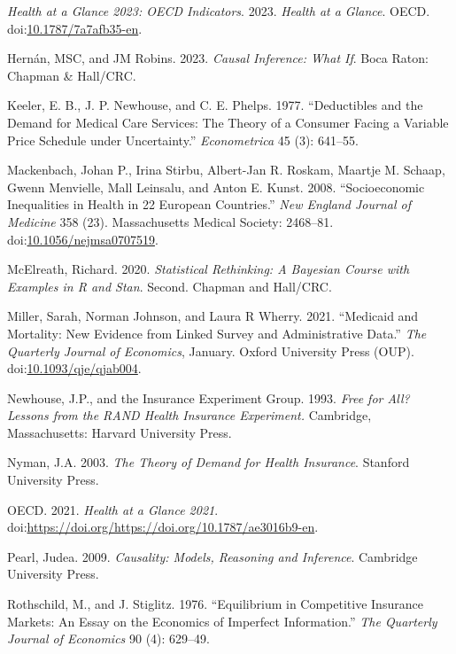 \documentclass[a4paper,12pt]{article}
\begin{document}
\hypertarget{citeproc_bib_item_13}{\textit{Health at a Glance 2023: OECD Indicators}. 2023. \textit{Health at a Glance}. OECD. doi:\href{https://doi.org/10.1787/7a7afb35-en}{10.1787/7a7afb35-en}.}

\hypertarget{citeproc_bib_item_14}{Hernán, MSC, and JM Robins. 2023. \textit{Causal Inference: What If}. Boca Raton: Chapman \& Hall/CRC.}

\hypertarget{citeproc_bib_item_15}{Keeler, E. B., J. P. Newhouse, and C. E. Phelps. 1977. “Deductibles and the Demand for Medical Care Services: The Theory of a Consumer Facing a Variable Price Schedule under Uncertainty.” \textit{Econometrica} 45 (3): 641–55.}

\hypertarget{citeproc_bib_item_16}{Mackenbach, Johan P., Irina Stirbu, Albert-Jan R. Roskam, Maartje M. Schaap, Gwenn Menvielle, Mall Leinsalu, and Anton E. Kunst. 2008. “Socioeconomic Inequalities in Health in 22 European Countries.” \textit{New England Journal of Medicine} 358 (23). Massachusetts Medical Society: 2468–81. doi:\href{https://doi.org/10.1056/nejmsa0707519}{10.1056/nejmsa0707519}.}

\hypertarget{citeproc_bib_item_17}{McElreath, Richard. 2020. \textit{Statistical Rethinking: A Bayesian Course with Examples in R and Stan}. Second. Chapman and Hall/CRC.}

\hypertarget{citeproc_bib_item_18}{Miller, Sarah, Norman Johnson, and Laura R Wherry. 2021. “Medicaid and Mortality: New Evidence from Linked Survey and Administrative Data.” \textit{The Quarterly Journal of Economics}, January. Oxford University Press (OUP). doi:\href{https://doi.org/10.1093/qje/qjab004}{10.1093/qje/qjab004}.}

\hypertarget{citeproc_bib_item_19}{Newhouse, J.P., and the Insurance Experiment Group. 1993. \textit{Free for All? Lessons from the RAND Health Insurance Experiment.} Cambridge, Massachusetts: Harvard University Press.}

\hypertarget{citeproc_bib_item_20}{Nyman, J.A. 2003. \textit{The Theory of Demand for Health Insurance}. Stanford University Press.}

\hypertarget{citeproc_bib_item_21}{OECD. 2021. \textit{Health at a Glance 2021}. doi:\url{https://doi.org/https://doi.org/10.1787/ae3016b9-en}.}

\hypertarget{citeproc_bib_item_22}{Pearl, Judea. 2009. \textit{Causality: Models, Reasoning and Inference}. Cambridge University Press.}

\hypertarget{citeproc_bib_item_23}{Rothschild, M., and J. Stiglitz. 1976. “Equilibrium in Competitive Insurance Markets: An Essay on the Economics of Imperfect Information.” \textit{The Quarterly Journal of Economics} 90 (4): 629–49.}
\end{document}
